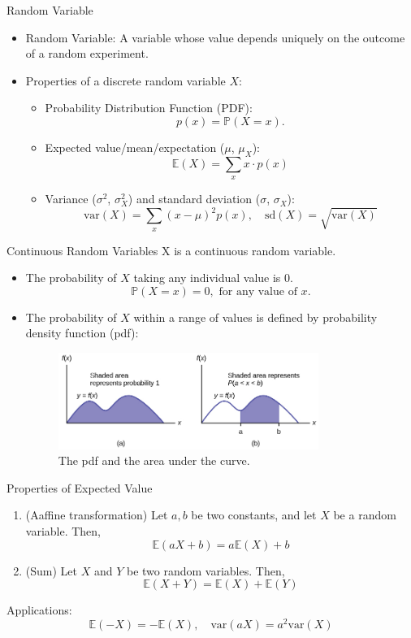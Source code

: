 \documentclass{beamer}
\newcommand{\pr}{\mathbb{P}}
\newcommand{\E}{\mathbb{E}}
\newcommand{\var}{\text{var}}
\newcommand{\sd}{\text{sd}}
\begin{document}
\begin{frame}{Random Variable}

\begin{itemize}
    \item Random Variable: A variable whose value depends uniquely on the outcome of a random experiment. 
    \item Properties of a discrete random variable $X$:
        \begin{itemize}
            \item Probability Distribution Function (PDF): $$ p(x) = \pr(X=x).$$
            \item Expected value/mean/expectation ($\mu$, $\mu_X$):
                $$\E(X)=\sum_{x} x\cdot p(x)$$
            \item Variance ($\sigma^2$, $\sigma_X^2$) and standard deviation ($\sigma$, $\sigma_X$):
                $$ \var(X) = \sum_x (x-\mu)^2 p(x),\quad \sd(X)=\sqrt{\var(X)} $$
        \end{itemize}
\end{itemize}
\end{frame}

\begin{frame}{Continuous Random Variables}
X is a continuous random variable. 
\begin{itemize}
\item The probability of $X$ taking any \alert{individual value} is $0$.
$$\pr(X=x)=0, \text{ for any value of }x.$$
\item The probability of $X$ \alert{within a range of values} is defined by probability density function (pdf):
\begin{figure}
    \caption{The pdf and the area under the curve.}
    \includegraphics[width=0.8\textwidth]{figures/pdf.jpg}
\end{figure}

\end{itemize}
\end{frame}


\begin{frame}{Properties of Expected Value}
\begin{enumerate}
\item (Aaffine transformation) Let $a,b$ be two constants, and let $X$ be a random variable. Then,
$$ \E(aX+b) = a \E(X) + b$$
\vspace{-0.4cm}
\item (Sum) Let $X$ and $Y$ be two random variables. Then,
$$ \E(X+Y) = \E(X)+\E(Y)$$
\end{enumerate}
Applications:
$$
\E(-X)=-\E(X),\quad \var(aX) = a^2 \var(X)
$$
\end{frame}
\end{document}
